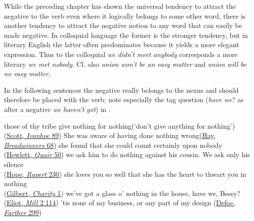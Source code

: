 \label{ch:6}

While the preceding chapter has shown the universal tendency to attract the negative to the verb even where it logically belongs to some other word, there is another tendency to attract the negative notion to any word that can easily be made negative.\label{p:made-neg} In colloquial language the former is the stronger tendency, but in literary English the latter often predominates because it yields a more elegant expression. Thus to the colloquial \textit{we didn't meet anybody} corresponds a more literary \textit{we met nobody}. Cf. also \textit{union won't be an easy matter} and \textit{union will be no easy matter}. 

In the following sentences  the negative really belongs to the nexus and should therefore be placed with the verb; note especially the tag question (\textit{have we}? as after a negative \textit{we haven't got}) in . %

\ea \label{ex:06-01}
\ea those of thy tribe give nothing for nothing\newline (`don't give anything for nothing')\hfill(\href{https://archive.org/details/scottsivanhoeedi0000amar/page/80/mode/2up?q=%22those+of+thy+tribe%22&view=theater}{Scott, \textit{Ivanhoe} 89})
\ex She was aware of having done nothing wrong\hfill(\href{https://archive.org/details/breadwinnersaso04haygoog/page/n72/mode/2up?view=theater&q=%22aware+of+having+done%22}{Hay, \textit{Breadwinners} 68})
\ex she found that she could count certainly upon nobody\\\hfill(\href{https://archive.org/details/queensquairorsi00hewlgoog/page/50/mode/2up?q=%22found+that+she+could+count%22&view=theater}{Hewlett, \textit{Quair} 50})
\ex we ask him to do nothing against his cousin. We ask only his silence\\\hfill(\href{https://archive.org/details/in.ernet.dli.2015.53170/page/n299/mode/2up?q=%22against+his+cousin%22&view=theater}{Hope, \textit{Rupert} 230})
\ex she loves you so well that she has the heart to thwart you in nothing\\\hfill(\href{https://archive.org/details/originalplays00gilbgoog/page/n140/mode/2up?q=%22heart+to+thwart%22&view=theater}{Gilbert, \textit{Charity} 1})
\ex \label{ex:06-got-have-we} we've got a glass o' nothing in the house, have we, Bessy?\\\hfill(\href{https://archive.org/details/millonfloss0009geor/page/378/mode/2up?q=%22got+a+glass%22&view=theater}{Eliot, \textit{Mill} 2.114}) %
\ex \label{ex:6-or-any-part} 'tis none of my business, or any part of my design \hfill (\href{https://archive.org/details/fartheradventure00defo/page/278/mode/2up?q=%22any+part+of+my%22&view=theater}{Defoe, \textit{Farther} 299}) 
\z
\z

